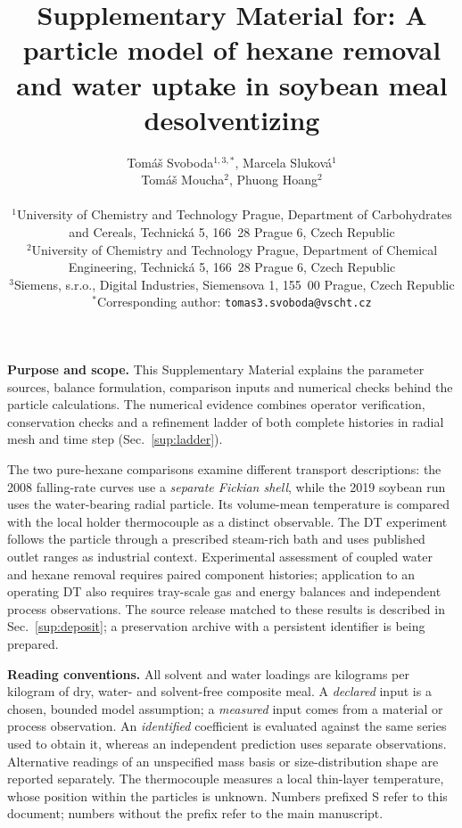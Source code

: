 \documentclass[11pt]{article}
\begin{document}
\title{Supplementary Material for: A particle model of hexane removal and water uptake in soybean meal desolventizing}
\author{Tom\'a\v{s} Svoboda$^{1,3,*}$, Marcela Slukov\'a$^{1}$\\
Tom\'a\v{s} Moucha$^{2}$, Phuong Hoang$^{2}$\\[6pt]
\parbox{0.88\textwidth}{\raggedright\normalsize
$^{1}$University of Chemistry and Technology Prague, Department of Carbohydrates and Cereals, Technick\'a 5, 166~28 Prague 6, Czech Republic\\[2pt]
$^{2}$University of Chemistry and Technology Prague, Department of Chemical Engineering, Technick\'a 5, 166~28 Prague 6, Czech Republic\\[2pt]
$^{3}$Siemens, s.r.o., Digital Industries, Siemensova 1, 155~00 Prague, Czech Republic\\[2pt]
$^{*}$Corresponding author: \texttt{tomas3.svoboda@vscht.cz}}}
\date{}
\maketitle

\noindent\textbf{Purpose and scope.} This Supplementary Material explains the parameter sources, balance formulation, comparison inputs and numerical checks behind the particle calculations. The numerical evidence combines operator verification, conservation checks and a refinement ladder of both complete histories in radial mesh and time step (Sec.~\ref{sup:ladder}).

The two pure-hexane comparisons examine different transport descriptions: the 2008 falling-rate curves use a \emph{separate Fickian shell}, while the 2019 soybean run uses the water-bearing radial particle. Its volume-mean temperature is compared with the local holder thermocouple as a distinct observable. The DT experiment follows the particle through a prescribed steam-rich bath and uses published outlet ranges as industrial context. Experimental assessment of coupled water and hexane removal requires paired component histories; application to an operating DT also requires tray-scale gas and energy balances and independent process observations. The source release matched to these results is described in Sec.~\ref{sup:deposit}; a preservation archive with a persistent identifier is being prepared.

\noindent\textbf{Reading conventions.} All solvent and water loadings are kilograms per kilogram of dry, water- and solvent-free composite meal. A \emph{declared} input is a chosen, bounded model assumption; a \emph{measured} input comes from a material or process observation. An \emph{identified} coefficient is evaluated against the same series used to obtain it, whereas an independent prediction uses separate observations. Alternative readings of an unspecified mass basis or size-distribution shape are reported separately. The thermocouple measures a local thin-layer temperature, whose position within the particles is unknown. Numbers prefixed S refer to this document; numbers without the prefix refer to the main manuscript.
\end{document}
